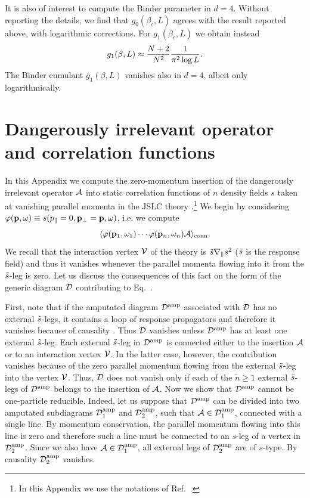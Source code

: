 \documentclass[12pt]{article}
\begin{document}
It is also of interest to compute the Binder parameter in $d=4$. 
Without reporting the details, we find that $g_0(\beta_c,L)$ 
agrees with the result reported above, with logarithmic corrections. 
For $g_1(\beta_c,L)$ we obtain instead
\begin{equation}
  g_1(\beta,L) \approx {N+2\over N^2} {1\over \pi^2 \log L}.
\end{equation}
The Binder cumulant $g_1(\beta,L)$ vanishes also in $d=4$, albeit only
logarithmically.




\section{Dangerously irrelevant operator and correlation functions} 
\label{AppB}

In this Appendix we compute the zero-momentum insertion of the dangerously
irrelevant operator ${\cal A}$ into static correlation functions of 
$n$ density fields $s$ taken at vanishing parallel momenta 
in the JSLC theory \cite{Janssen86a}.\footnote{In this Appendix we use the 
notations of Ref.~\cite{Janssen86a}.}
We begin by considering 
$\varphi({\bf p},\omega) \equiv s(p_\| =0,{\bf p}_\bot = {\bf p},\omega)$, 
i.e. we compute
\begin{equation}
\langle \varphi({\bf p}_1,\omega_1) \cdots \varphi({\bf p}_n,\omega_n) {\cal A}
   \rangle_{\rm conn} .
\label{insertion}
\end{equation}
We recall that
the interaction vertex ${\cal V}$ of the theory \cite{Janssen86a} is 
$\tilde{s} \nabla_{\|} s^2$  ($\tilde{s}$ is the response field)
and thus it vanishes whenever the
parallel momenta flowing into it from the $\tilde{s}$-leg is zero. 
Let us discuss the consequences of this fact on the form of the
generic diagram ${\cal D}$ contributing to Eq.~.  

First, note that if the amputated diagram ${\cal D}^{\rm amp}$
associated with ${\cal D}$ has no external $\tilde{s}$-legs, it contains a loop
of response propagators and therefore it
vanishes because of causality \cite{Janssen76,Bausch76,Janssen79}.
Thus ${\cal D}$ vanishes unless ${\cal D}^{\rm amp}$ has at least one
external $\tilde{s}$-leg. 
Each external $\tilde{s}$-leg in ${\cal D}^{\rm amp}$ 
is connected either to 
the insertion ${\cal A}$ or to an interaction vertex 
${\cal V}$. In the latter case, however,
the contribution vanishes because of the zero parallel momentum
flowing from the external $\tilde{s}$-leg into the vertex ${\cal V}$. 
Thus, 
${\cal D}$ does not vanish only if each of the $\tilde{n}\ge1$ 
external $\tilde{s}$-legs of ${\cal D}^{\rm amp}$ belongs
to the insertion of ${\cal A}$. 
Now we show that ${\cal D}^{\rm amp}$
cannot be one-particle reducible. 
Indeed, let us suppose that ${\cal D}^{\rm amp}$ 
can be divided into two amputated subdiagrams ${\cal D}^{\rm amp}_1$ 
and ${\cal D}^{\rm amp}_2$, such that ${\cal A}\in{\cal D}^{\rm amp}_1$,
connected with a single line. 
By momentum conservation, the parallel momentum flowing into
this line is zero and therefore such a line must be connected to an $s$-leg
of a vertex in ${\cal D}_2^{\rm amp}$.
Since we also have ${\cal A}\in{\cal D}^{\rm amp}_1$, 
all external legs of ${\cal D}^{\rm amp}_2$ are of $s$-type. 
By causality ${\cal D}^{\rm amp}_2$ vanishes.
\end{document}
